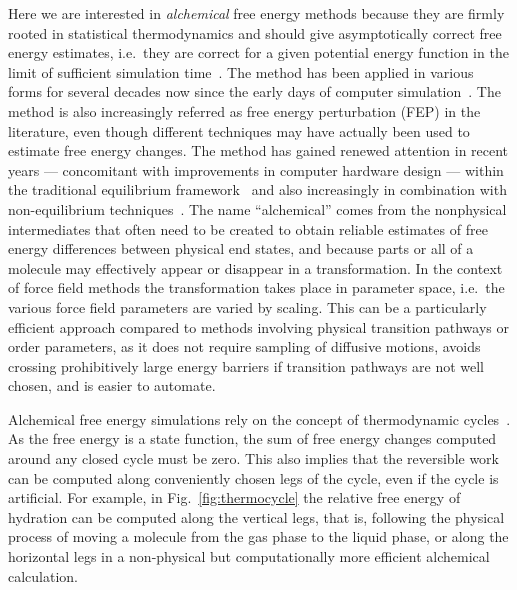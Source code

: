 \documentclass[journal=jctcce,manuscript=article]{achemso}
\begin{document}
Here we are interested in \emph{alchemical} free energy methods because they
are firmly rooted in statistical thermodynamics and should give asymptotically
correct free energy estimates, i.e.\ they are correct for a given potential
energy function in the limit of sufficient simulation
time~\cite{Beveridge-citeulike:3789890, straatsma:92, doi:10.1021/cr00023a004,
hansen_practical_2014}.
The method has been applied in various forms for
several decades now since the early days of computer
simulation~\cite{doi:10.1063/1.1671118, bennett_efficient_1976,
doi:10.1063/1.432264, FS9821700055,  Tembe1984281, doi:10.1063/1.449208}.
The method is also increasingly referred as free energy perturbation (FEP)  in the literature, even though different techniques may have actually been used to estimate free energy changes.
The method has gained renewed attention in recent years --- concomitant with
improvements in computer hardware design --- within the traditional equilibrium
framework~\cite{GILSON19971047, doi:10.1021/jp0217839, deng_computations_2009}
and also increasingly in combination with non-equilibrium
techniques~\cite{ytreberg_comparison_2006, JCC:JCC23804,
  doi:10.1021/ct500964e}.  The name ``alchemical'' comes from the nonphysical
intermediates that often need to be created to obtain reliable estimates of
free energy differences between physical end states, and because parts or
all of a molecule may effectively appear or disappear in a transformation.  In the
context of force field methods the transformation takes place in parameter
space, i.e.\ the various force field parameters are varied by scaling.  This
can be a particularly efficient approach compared to methods involving physical transition pathways or order parameters, as it does not require sampling of
diffusive motions, avoids crossing prohibitively large energy barriers if
transition pathways are not well chosen, and is easier to automate.

Alchemical free energy simulations rely on the concept of thermodynamic
cycles~\cite{Tembe1984281}.
As the free energy is a state function, the sum of free energy changes
computed around any closed cycle must be zero.  This also implies
that the reversible work can be computed along
conveniently chosen legs of the cycle, even if the cycle is artificial.  For example, in
Fig.~\ref{fig:thermocycle} the relative free energy of hydration can
be computed along the vertical legs, that is, following the physical
process of moving a molecule from the gas phase to the liquid phase,
or along the horizontal legs in a non-physical but computationally more
efficient alchemical calculation.
\end{document}
